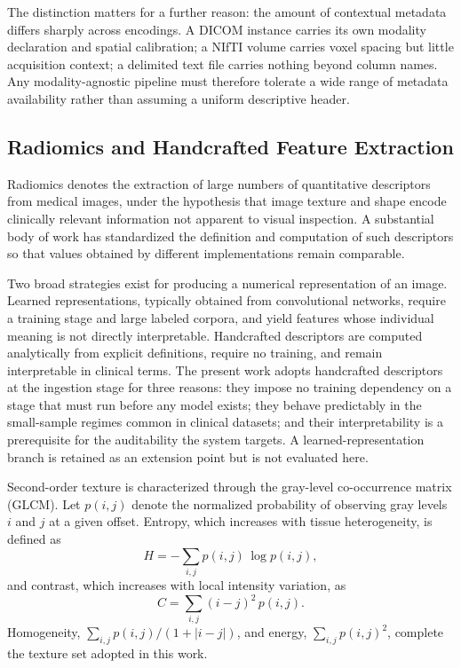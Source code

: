 The distinction matters for a further reason: the amount of contextual metadata differs sharply
across encodings. A DICOM instance carries its own modality declaration and spatial calibration; a
NIfTI volume carries voxel spacing but little acquisition context; a delimited text file carries
nothing beyond column names. Any modality-agnostic pipeline must therefore tolerate a wide range of
metadata availability rather than assuming a uniform descriptive header.

\subsection{Radiomics and Handcrafted Feature Extraction}
\label{subsec:radiomica}

Radiomics denotes the extraction of large numbers of quantitative descriptors from medical images,
under the hypothesis that image texture and shape encode clinically relevant information not
apparent to visual inspection. A substantial body of work has
standardized the definition and computation of such descriptors so that values obtained by
different implementations remain comparable.

Two broad strategies exist for producing a numerical representation of an image. Learned
representations, typically obtained from convolutional networks, require a training stage and large
labeled corpora, and yield features whose individual meaning is not directly interpretable.
Handcrafted descriptors are computed analytically from explicit definitions, require no training,
and remain interpretable in clinical terms. The present work adopts handcrafted descriptors at the
ingestion stage for three reasons: they impose no training dependency on a stage that must run
before any model exists; they behave predictably in the small-sample regimes common in clinical
datasets; and their interpretability is a prerequisite for the auditability the system targets. A
learned-representation branch is retained as an extension point but is not evaluated here.

Second-order texture is characterized through the gray-level co-occurrence matrix
(GLCM). Let $p(i,j)$ denote the normalized probability of
observing gray levels $i$ and $j$ at a given offset. Entropy, which increases with tissue
heterogeneity, is defined as
\begin{equation}
    H = -\sum_{i,j} p(i,j)\,\log p(i,j),
    \label{eq:entropia}
\end{equation}
and contrast, which increases with local intensity variation, as
\begin{equation}
    C = \sum_{i,j} (i-j)^{2}\, p(i,j).
    \label{eq:contraste}
\end{equation}
Homogeneity, $\sum_{i,j} p(i,j) / (1 + |i-j|)$, and energy, $\sum_{i,j} p(i,j)^{2}$, complete the
texture set adopted in this work.

